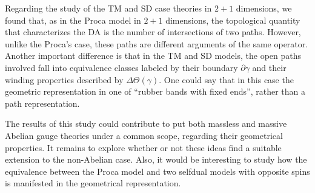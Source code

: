 \documentclass[a4paper,12pt]{article}
\begin{document}
Regarding the study of the TM and SD case theories in $2+1$
dimensions, we found that, as in the Proca model in $2+1$
dimensions, the topological quantity that characterizes the DA is
the number of intersections of two paths. However, unlike the
Proca's case, these paths are different arguments of the same
operator. Another important difference is that in the TM and SD
models, the open paths involved fall into equivalence classes
labeled by their boundary $\partial\gamma$ and their winding
properties described by $\Delta\Theta(\gamma)$. One could say
that in this case the geometric representation in one of ``rubber
bands with fixed ends'', rather than a path representation.

The results of this study could contribute to put both massless
and massive Abelian gauge theories under a common scope, regarding
their geometrical properties. It remains to explore whether or
not these ideas find a suitable extension to the non-Abelian case. Also, it 
would be interesting to study how the equivalence between the Proca model and 
two selfdual models with opposite spins is manifested in the geometrical representation. 


\appendix
\end{document}
